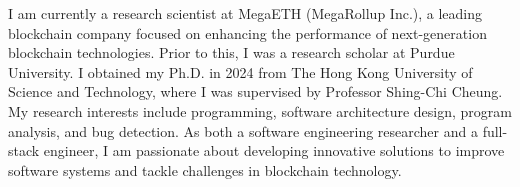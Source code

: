%
%
%
\par{
	I am currently a research scientist at MegaETH (MegaRollup Inc.), a leading blockchain company focused on enhancing the performance of next-generation blockchain technologies. Prior to this, I was a research scholar at Purdue University. I obtained my Ph.D. in 2024 from The Hong Kong University of Science and Technology, where I was supervised by Professor Shing-Chi Cheung. My research interests include programming, software architecture design, program analysis, and bug detection. As both a software engineering researcher and a full-stack engineer, I am passionate about developing innovative solutions to improve software systems and tackle challenges in blockchain technology.
}
